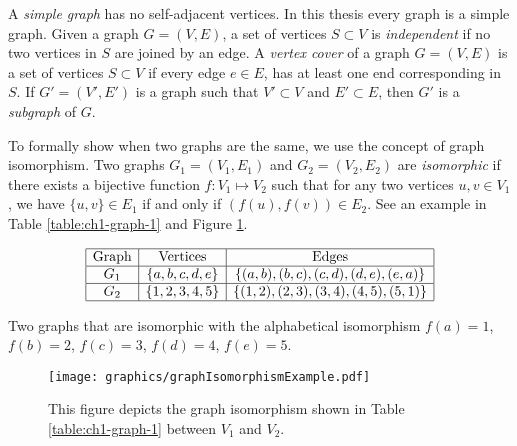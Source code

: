 \documentclass[10pt]{CSUNthesis}
\theoremstyle{plain}%
\theoremstyle{definition}
\theoremstyle{remark}
\begin{document}
A \textit{simple graph} has no self-adjacent vertices.
In this thesis every graph is a simple graph.
Given a graph $G = (V,E)$, a set of vertices $S \subset V$ is \textit{independent} if no two vertices in $S$ are joined by an edge. 
A \textit{vertex cover} of a graph $G = (V,E)$  is a set of vertices $S \subset V$ if every edge $e \in E$, has at least one end corresponding in $S$.
If $G' = (V',E')$ is a graph such that $V' \subset V$ and $E' \subset E$, then $G'$ is a \textit{subgraph} of $G$.

To formally show when two graphs are the same, we use the concept of graph isomorphism.
Two graphs $G_1 =(V_1,E_1)$ and $G_2 = (V_2,E_2) $ are \textit{isomorphic} if there exists a bijective function $f: V_1 \mapsto V_2$ such that for any two vertices $u,v \in V_1$, we have $\{u, v\} \in E_1$ if and only if $(f(u),f(v)) \in E_2$. 
See an example in Table \ref{table:ch1-graph-1} and Figure \ref{fig:configuration-3}.
\begin{table}[!htbp]\label{table:ch1-graph-1}
\begin{center}
$$\begin{array}{|c|c|c|}\hline
\text{Graph}&\text{Vertices}&\text{Edges}\\\hline
G_1&\left\lbrace a,b,c,d,e \right\rbrace & \left\lbrace (a,b),(b,c),(c,d),(d,e),(e,a) \right\rbrace 
\\\hline
G_2&\left\lbrace 1,2,3,4,5 \right\rbrace & \left\lbrace (1,2),(2,3),(3,4),(4,5),(5,1) \right\rbrace 
\\\hline
\end{array} $$
\caption{Two graphs that are isomorphic with the alphabetical isomorphism $f(a)=1$, $f(b)=2$, $f(c) 
= 3$, $f(d)=4$, $f(e)=5$.}
\end{center} 
\end{table}

\begin{figure}[!htbp]
\begin{center}
\texttt{[image: graphics/graphIsomorphismExample.pdf]}
\end{center} 
\caption{This figure depicts the graph isomorphism shown in Table \ref{table:ch1-graph-1} between $V_1$ and $V_2$.}
\label{fig:configuration-3}
\end{figure}
\end{document}
